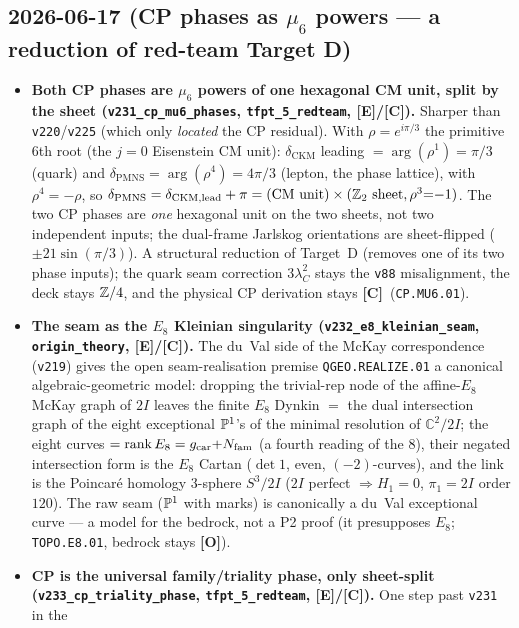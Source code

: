 \documentclass[11pt]{article}
\providecommand{\mE}{\textbf{[E]}}\providecommand{\mC}{\textbf{[C]}}
\providecommand{\mO}{\textbf{[O]}}\providecommand{\mX}{\textbf{[X]}}
\providecommand{\vref}[1]{\texttt{#1}}
\begin{document}
\subsection*{2026-06-17 (CP phases as $\mu_6$ powers --- a reduction of red-team Target D)}
\begin{itemize}
\item \textbf{Both CP phases are $\mu_6$ powers of one hexagonal CM unit, split by the sheet
  (\texttt{v231\_cp\_mu6\_phases}, \texttt{tfpt\_5\_redteam}, \mE/\mC).} Sharper than \vref{v220}/\vref{v225}
  (which only \emph{located} the CP residual). With $\rho=e^{i\pi/3}$ the primitive $6$th root (the $j{=}0$
  Eisenstein CM unit): $\delta_{\mathrm{CKM}}$ leading $=\arg(\rho^1)=\pi/3$ (quark) and
  $\delta_{\mathrm{PMNS}}=\arg(\rho^4)=4\pi/3$ (lepton, the phase lattice), with $\rho^4=-\rho$, so
  $\delta_{\mathrm{PMNS}}=\delta_{\mathrm{CKM,lead}}+\pi=(\text{CM unit})\times(\mathbb{Z}_2\text{ sheet}, \rho^3{=}{-}1)$.
  The two CP phases are \emph{one} hexagonal unit on the two sheets, not two independent inputs; the
  dual-frame Jarlskog orientations are sheet-flipped ($\pm21\sin(\pi/3)$). A structural reduction of Target~D
  (removes one of its two phase inputs); the quark seam correction $3\lambda_C^2$ stays the \vref{v88}
  misalignment, the deck stays $\mathbb{Z}/4$, and the physical CP derivation stays \mC\ (\texttt{CP.MU6.01}).
\item \textbf{The seam as the $E_8$ Kleinian singularity (\texttt{v232\_e8\_kleinian\_seam},
  \texttt{origin\_theory}, \mE/\mC).} The du~Val side of the McKay correspondence (\vref{v219}) gives the
  open seam-realisation premise \texttt{QGEO.REALIZE.01} a canonical algebraic-geometric model: dropping the
  trivial-rep node of the affine-$E_8$ McKay graph of $2I$ leaves the finite $E_8$ Dynkin $=$ the dual
  intersection graph of the eight exceptional $\mathbb{P}^1$'s of the minimal resolution of $\mathbb C^2/2I$; the
  eight curves $=\operatorname{rank}E_8=g_{\mathrm{car}}{+}N_{\mathrm{fam}}$ (a fourth reading of the $8$), their negated
  intersection form is the $E_8$ Cartan ($\det1$, even, $(-2)$-curves), and the link is the Poincar\'e
  homology $3$-sphere $S^3/2I$ ($2I$ perfect $\Rightarrow H_1{=}0$, $\pi_1{=}2I$ order $120$). The raw seam
  ($\mathbb{P}^1$ with marks)   is canonically a du~Val exceptional curve --- a model for the bedrock, not a P2 proof
  (it presupposes $E_8$; \texttt{TOPO.E8.01}, bedrock stays \mO).
\item \textbf{CP is the universal family/triality phase, only sheet-split
  (\texttt{v233\_cp\_triality\_phase}, \texttt{tfpt\_5\_redteam}, \mE/\mC).} One step past \vref{v231} in the

\end{itemize}
\end{document}
